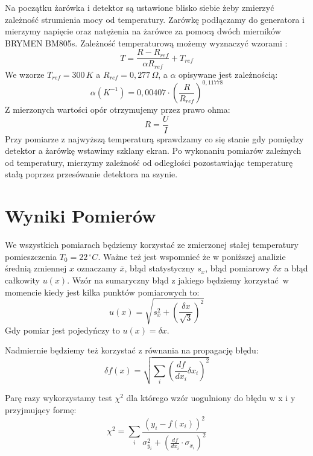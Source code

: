 \documentclass[12pt]{article}
\begin{document}
Na początku żarówka i detektor są ustawione blisko siebie żeby zmierzyć zależność strumienia mocy od temperatury.
Zarówkę podłączamy do generatora i mierzymy napięcie oraz natężenia na żarówce za pomocą dwóch mierników BRYMEN BM805s. Zależność temperaturową możemy wyznaczyć wzorami \cite{skrypt}:
\begin{equation}
    T = \frac{R - R_{ref}}{\alpha R_{ref}} + T_{ref}
    \label{eq:temp_bulb}
\end{equation}
We wzorze $T_{ref} = 300\,K$ a $R_{ref} = 0{,}277\, \Omega$, a $\alpha$ opisywane jest zależnością:
\[
    \alpha(K^{-1}) = 0{,}00407 \cdot (\frac{R}{R_{ref}})^{0{,}11778}
\]
Z mierzonych wartości opór otrzymujemy przez prawo ohma:
\[
    R = \frac{U}{I}
\]
Przy pomiarze z najwyższą temperaturą sprawdzamy co się stanie gdy pomiędzy detektor a żarówkę wstawimy szklany ekran.
Po wykonaniu pomiarów zależnych od temperatury, mierzymy zależność od odległości pozostawiając temperaturę stałą poprzez przesówanie detektora na szynie.
\section{Wyniki Pomierów}
We wszystkich pomiarach będziemy korzystać ze zmierzonej stałej temperatury pomieszczenia $T_0 = 22 \, ^{\circ}C$.
Ważne też jest wspomnieć że w poniższej analizie średnią zmiennej $x$ oznaczamy $\bar{x}$, błąd statystyczny $s_x$, błąd pomiarowy $\delta x$ a błąd całkowity $u(x)$.
Wzór na sumaryczny błąd z jakiego będziemy korzystać w momencie kiedy jest kilka punktów pomiarowych to:
\begin{equation}
    u(x) = \sqrt{s_x^2 + (\frac{\delta x}{\sqrt{3}})^2}
    \label{eq:combined_error}
\end{equation}
Gdy pomiar jest pojedyńczy to $u(x) = \delta x$.

Nadmiernie będziemy też korzystać z równania na propagację błędu:
\begin{equation}
    \delta f(x) = \sqrt{\sum_{i} (\frac{df}{dx_i} \delta x_i)^2}
    \label{eq:error_propagation}
\end{equation}

Parę razy wykorzystamy test $\chi^2$ dla którego wzór uogulniony do błędu w x i y przyjmujący formę:
\begin{equation}
    \chi^2 = \sum_{i} \frac{\left( y_i - f(x_i) \right)^2}{\sigma_{y_i}^2 + \left( \frac{df}{dx_i} \cdot \sigma_{x_i} \right)^2}
    \label{eq:chi2}
\end{equation}
\end{document}
